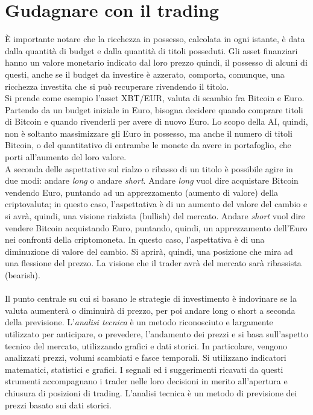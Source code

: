 \documentclass[a4paper,12pt]{report}
\begin{document}
\section{Gudagnare con il trading}
È importante notare che la ricchezza in possesso, calcolata in ogni istante, è data dalla quantità di budget e dalla quantità di titoli posseduti. Gli asset finanziari hanno un valore monetario indicato dal loro prezzo quindi, il possesso di alcuni di questi, anche se il budget da investire è azzerato, comporta, comunque, una ricchezza investita che si può recuperare rivendendo il titolo.\\
Si prende come esempio l'asset XBT/EUR, valuta di scambio fra Bitcoin e Euro. Partendo da un budget iniziale in Euro, bisogna decidere quando comprare titoli di Bitcoin e quando rivenderli per avere di nuovo Euro. Lo scopo della AI, quindi, non è soltanto massimizzare gli Euro in possesso, ma anche il numero di titoli Bitcoin, o del quantitativo di entrambe le monete da avere in portafoglio, che porti all'aumento del loro valore.\\
A seconda delle aspettative sul rialzo o ribasso di un titolo è possibile agire in due modi: andare \textit{long} o andare \textit{short}. Andare \textit{long} vuol dire acquistare Bitcoin vendendo Euro, puntando ad un apprezzamento (aumento di valore) della criptovaluta; in questo caso, l’aspettativa è di un aumento del valore del cambio e si avrà, quindi, una visione rialzista (bullish) del mercato. Andare \textit{short} vuol dire vendere Bitcoin acquistando Euro, puntando, quindi, un apprezzamento dell'Euro nei confronti della criptomoneta. In questo caso, l’aspettativa è di una diminuzione di valore del cambio. Si aprirà, quindi, una posizione che mira ad una flessione del prezzo. La visione che il trader avrà del mercato sarà ribassista (bearish).\\~\\
Il punto centrale su cui si basano le strategie di investimento è indovinare se la valuta aumenterà o diminuirà di prezzo, per poi andare long o short a seconda della previsione. L'\textit{analisi tecnica} è un metodo riconosciuto e largamente utilizzato per anticipare, o prevedere, l'andamento dei prezzi e si basa sull'aspetto tecnico del mercato, utilizzando grafici e dati storici. In particolare, vengono analizzati prezzi, volumi scambiati e fasce temporali. Si utilizzano indicatori matematici, statistici e grafici. I segnali ed i suggerimenti ricavati da questi strumenti accompagnano i trader nelle loro decisioni in merito all'apertura e chiusura di posizioni di trading. L'analisi tecnica è un metodo di previsione dei prezzi basato sui dati storici.
\end{document}
